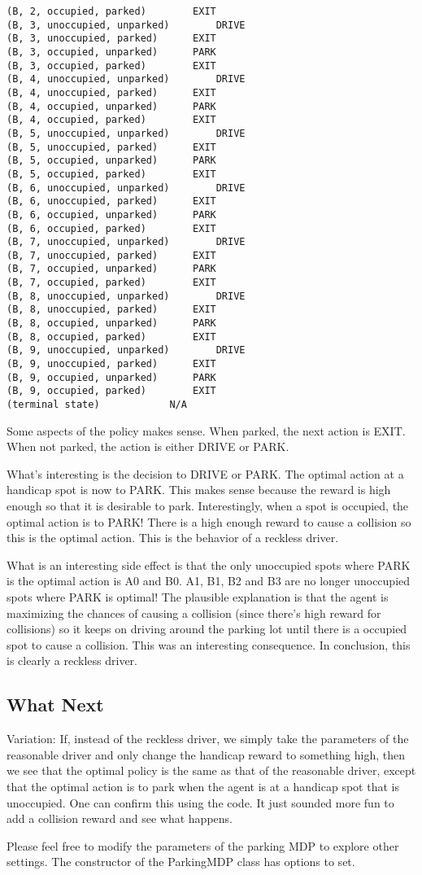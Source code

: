 \documentclass[paper=a4, fontsize=11pt]{scrartcl}
\begin{document}
\begin{verbatim}
(B, 2, occupied, parked)		EXIT
(B, 3, unoccupied, unparked)		DRIVE
(B, 3, unoccupied, parked)		EXIT
(B, 3, occupied, unparked)		PARK
(B, 3, occupied, parked)		EXIT
(B, 4, unoccupied, unparked)		DRIVE
(B, 4, unoccupied, parked)		EXIT
(B, 4, occupied, unparked)		PARK
(B, 4, occupied, parked)		EXIT
(B, 5, unoccupied, unparked)		DRIVE
(B, 5, unoccupied, parked)		EXIT
(B, 5, occupied, unparked)		PARK
(B, 5, occupied, parked)		EXIT
(B, 6, unoccupied, unparked)		DRIVE
(B, 6, unoccupied, parked)		EXIT
(B, 6, occupied, unparked)		PARK
(B, 6, occupied, parked)		EXIT
(B, 7, unoccupied, unparked)		DRIVE
(B, 7, unoccupied, parked)		EXIT
(B, 7, occupied, unparked)		PARK
(B, 7, occupied, parked)		EXIT
(B, 8, unoccupied, unparked)		DRIVE
(B, 8, unoccupied, parked)		EXIT
(B, 8, occupied, unparked)		PARK
(B, 8, occupied, parked)		EXIT
(B, 9, unoccupied, unparked)		DRIVE
(B, 9, unoccupied, parked)		EXIT
(B, 9, occupied, unparked)		PARK
(B, 9, occupied, parked)		EXIT
(terminal state)			N/A
\end{verbatim}

Some aspects of the policy makes sense. When parked, the next action is EXIT. When not parked, the action is either DRIVE or PARK.

What's interesting is the decision to DRIVE or PARK. The optimal action at a handicap spot is now to PARK. This makes sense because the reward is high enough so that it is desirable to park. Interestingly, when a spot is occupied, the optimal action is to PARK! There is a high enough reward to cause a collision so this is the optimal action. This is the behavior of a reckless driver.

What is an interesting side effect is that the only unoccupied spots where PARK is the optimal action is A0 and B0. A1, B1, B2 and B3 are no longer unoccupied spots where PARK is optimal! The plausible explanation is that the agent is maximizing the chances of causing a collision (since there's high reward for collisions) so it keeps on driving around the parking lot until there is a occupied spot to cause a collision. This was an interesting consequence. In conclusion, this is clearly a reckless driver.

\subsection{What Next}

Variation: If, instead of the reckless driver, we simply take the parameters of the reasonable driver and only change the handicap reward to something high, then we see that the optimal policy is the same as that of the reasonable driver, except that the optimal action is to park when the agent is at a handicap spot that is unoccupied. One can confirm this using the code. It just sounded more fun to add a collision reward and see what happens.

Please feel free to modify the parameters of the parking MDP to explore other settings. The constructor of the ParkingMDP class has options to set.
\end{document}
